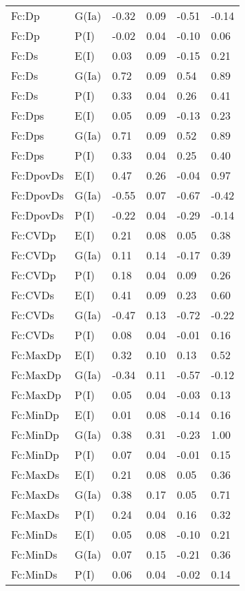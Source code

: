 \begin{center}
\begin{longtable}{|p{1.1in}|p{0.7in}|p{0.7in}|p{0.6in}|p{0.6in}|p{0.6in}|}
  Fc:Dp & G(Ia) & -0.32 & 0.09 & -0.51 & -0.14 \\ 
  Fc:Dp & P(I) & -0.02 & 0.04 & -0.10 & 0.06 \\ 
  Fc:Ds & E(I) & 0.03 & 0.09 & -0.15 & 0.21 \\ 
  Fc:Ds & G(Ia) & 0.72 & 0.09 & 0.54 & 0.89 \\ 
  Fc:Ds & P(I) & 0.33 & 0.04 & 0.26 & 0.41 \\ 
  Fc:Dps & E(I) & 0.05 & 0.09 & -0.13 & 0.23 \\ 
  Fc:Dps & G(Ia) & 0.71 & 0.09 & 0.52 & 0.89 \\ 
  Fc:Dps & P(I) & 0.33 & 0.04 & 0.25 & 0.40 \\ 
  Fc:DpovDs & E(I) & 0.47 & 0.26 & -0.04 & 0.97 \\ 
  Fc:DpovDs & G(Ia) & -0.55 & 0.07 & -0.67 & -0.42 \\ 
  Fc:DpovDs & P(I) & -0.22 & 0.04 & -0.29 & -0.14 \\ 
  Fc:CVDp & E(I) & 0.21 & 0.08 & 0.05 & 0.38 \\ 
  Fc:CVDp & G(Ia) & 0.11 & 0.14 & -0.17 & 0.39 \\ 
  Fc:CVDp & P(I) & 0.18 & 0.04 & 0.09 & 0.26 \\ 
  Fc:CVDs & E(I) & 0.41 & 0.09 & 0.23 & 0.60 \\ 
  Fc:CVDs & G(Ia) & -0.47 & 0.13 & -0.72 & -0.22 \\ 
  Fc:CVDs & P(I) & 0.08 & 0.04 & -0.01 & 0.16 \\ 
  Fc:MaxDp & E(I) & 0.32 & 0.10 & 0.13 & 0.52 \\ 
  Fc:MaxDp & G(Ia) & -0.34 & 0.11 & -0.57 & -0.12 \\ 
  Fc:MaxDp & P(I) & 0.05 & 0.04 & -0.03 & 0.13 \\ 
  Fc:MinDp & E(I) & 0.01 & 0.08 & -0.14 & 0.16 \\ 
  Fc:MinDp & G(Ia) & 0.38 & 0.31 & -0.23 & 1.00 \\ 
  Fc:MinDp & P(I) & 0.07 & 0.04 & -0.01 & 0.15 \\ 
  Fc:MaxDs & E(I) & 0.21 & 0.08 & 0.05 & 0.36 \\ 
  Fc:MaxDs & G(Ia) & 0.38 & 0.17 & 0.05 & 0.71 \\ 
  Fc:MaxDs & P(I) & 0.24 & 0.04 & 0.16 & 0.32 \\ 
  Fc:MinDs & E(I) & 0.05 & 0.08 & -0.10 & 0.21 \\ 
  Fc:MinDs & G(Ia) & 0.07 & 0.15 & -0.21 & 0.36 \\ 
  Fc:MinDs & P(I) & 0.06 & 0.04 & -0.02 & 0.14 \\ 

\end{longtable}
\end{center}

